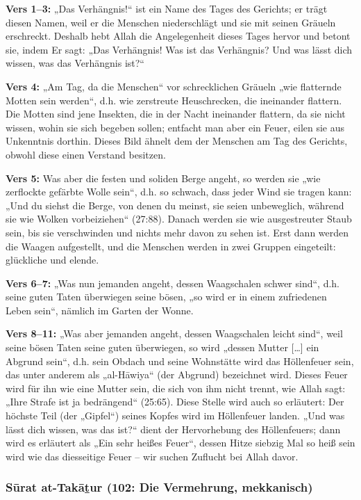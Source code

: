 \textbf{Vers 1–3:} „Das Verhängnis!“ ist ein Name des Tages des Gerichts; er trägt diesen Namen,
weil er die Menschen niederschlägt und sie mit seinen Gräueln erschreckt. Deshalb hebt Allah die
Angelegenheit dieses Tages hervor und betont sie, indem Er sagt: „Das Verhängnis! Was ist das
Verhängnis? Und was lässt dich wissen, was das Verhängnis ist?“

\textbf{Vers 4:} „Am Tag, da die Menschen“ vor schrecklichen Gräueln „wie flatternde Motten sein
werden“, d.h. wie zerstreute Heuschrecken, die ineinander flattern. Die Motten sind jene
Insekten, die in der Nacht ineinander flattern, da sie nicht wissen, wohin sie sich begeben sollen;
entfacht man aber ein Feuer, eilen sie aus Unkenntnis dorthin. Dieses Bild ähnelt dem der
Menschen am Tag des Gerichts, obwohl diese einen Verstand besitzen.

\textbf{Vers 5:} Was aber die festen und soliden Berge angeht, so werden sie „wie zerflockte
gefärbte Wolle sein“, d.h. so schwach, dass jeder Wind sie tragen kann: „Und du siehst die
Berge, von denen du meinst, sie seien unbeweglich, während sie wie Wolken vorbeiziehen“
(27:88). Danach werden sie wie ausgestreuter Staub sein, bis sie verschwinden und nichts mehr
davon zu sehen ist. Erst dann werden die Waagen aufgestellt, und die Menschen werden in zwei
Gruppen eingeteilt: glückliche und elende.

\textbf{Vers 6–7:} „Was nun jemanden angeht, dessen Waagschalen schwer sind“, d.h. seine
guten Taten überwiegen seine bösen, „so wird er in einem zufriedenen Leben sein“, nämlich im
Garten der Wonne.

\textbf{Vers 8–11:} „Was aber jemanden angeht, dessen Waagschalen leicht sind“, weil seine
bösen Taten seine guten überwiegen, so wird „dessen Mutter […] ein Abgrund sein“, d.h. sein
Obdach und seine Wohnstätte wird das Höllenfeuer sein, das unter anderem als „al-Hāwiya“ (der
Abgrund) bezeichnet wird. Dieses Feuer wird für ihn wie eine Mutter sein, die sich von ihm nicht
trennt, wie Allah  sagt: „Ihre Strafe ist ja bedrängend“ (25:65). Diese Stelle wird auch so
erläutert: Der höchste Teil (der „Gipfel“) seines Kopfes wird im Höllenfeuer landen. „Und was
lässt dich wissen, was das ist?“ dient der Hervorhebung des Höllenfeuers; dann wird es erläutert
als „Ein sehr heißes Feuer“, dessen Hitze siebzig Mal so heiß sein wird wie das diesseitige Feuer
– wir suchen Zuflucht bei Allah davor.

\subsubsection*{Sūrat at-Takāṯur (102: Die Vermehrung, mekkanisch)}

